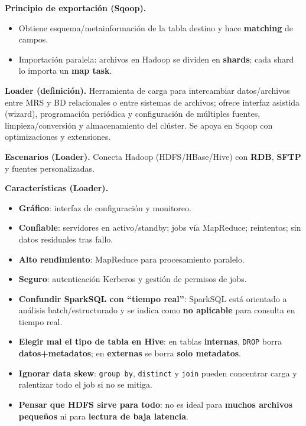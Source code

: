 \documentclass[8pt,a4paper,twocolumn]{article}
\begin{document}
\textbf{Principio de exportación (Sqoop).}
\begin{itemize}
\item Obtiene esquema/metainformación de la tabla destino y hace \textbf{matching} de campos.
\item Importación paralela: archivos en Hadoop se dividen en \textbf{shards}; cada shard lo importa un \textbf{map task}.
\end{itemize}

\textbf{Loader (definición).} Herramienta de carga para intercambiar datos/archivos entre MRS y BD relacionales o entre sistemas de archivos; ofrece interfaz asistida (wizard), programación periódica y configuración de múltiples fuentes, limpieza/conversión y almacenamiento del clúster. Se apoya en Sqoop con optimizaciones y extensiones.

\textbf{Escenarios (Loader).} Conecta Hadoop (HDFS/HBase/Hive) con \textbf{RDB}, \textbf{SFTP} y fuentes personalizadas.

\textbf{Características (Loader).}
\begin{itemize}
\item \textbf{Gráfico}: interfaz de configuración y monitoreo.
\item \textbf{Confiable}: servidores en activo/standby; jobs vía MapReduce; reintentos; sin datos residuales tras fallo.
\item \textbf{Alto rendimiento}: MapReduce para procesamiento paralelo.
\item \textbf{Seguro}: autenticación Kerberos y gestión de permisos de jobs.
\end{itemize}

\begin{tcolorbox}[colback=black!7,colframe=black!35,boxrule=0.3pt,arc=1pt,left=4pt,right=4pt,top=3pt,bottom=3pt,title=\textbf{Errores comunes o confusiones frecuentes}]
\begin{itemize}
\item \textbf{Confundir SparkSQL con ``tiempo real''}: SparkSQL está orientado a análisis batch/estructurado y se indica como \textbf{no aplicable} para consulta en tiempo real.
\item \textbf{Elegir mal el tipo de tabla en Hive}: en tablas \textbf{internas}, \texttt{DROP} borra \textbf{datos+metadatos}; en \textbf{externas} se borra \textbf{solo metadatos}.
\item \textbf{Ignorar data skew}: \texttt{group by}, \texttt{distinct} y \texttt{join} pueden concentrar carga y ralentizar todo el job si no se mitiga.
\item \textbf{Pensar que HDFS sirve para todo}: no es ideal para \textbf{muchos archivos pequeños} ni para \textbf{lectura de baja latencia}.
\end{itemize}
\end{tcolorbox}
\end{document}
